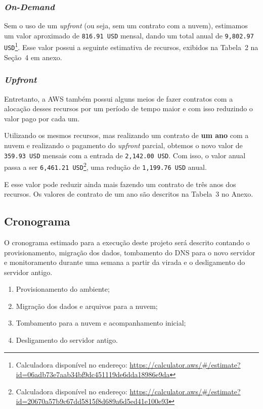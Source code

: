 \documentclass{article}
\begin{document}
\subsubsection{\textit{On-Demand}}

Sem o uso de um \textit{upfront} (ou seja, sem um contrato com a nuvem), estimamos um valor aproximado de \texttt{816.91 USD} mensal, dando um total anual de \texttt{9,802.97 USD}\footnote{Calculadora disponível no endereço: \url{https://calculator.aws/\#/estimate?id=06adb73e7aab34bf9dc451119de6dda18986e9da}}. Esse valor possui a seguinte estimativa de recursos, exibidos na Tabela~2 na Seção~4 em anexo.


\subsubsection{\textit{Upfront}}

Entretanto, a AWS também possui alguns meios de fazer contratos com a alocação desses recursos por um período de tempo maior e com isso reduzindo o valor pago por cada um.

Utilizando os mesmos recursos, mas realizando um contrato de \textbf{um ano} com a nuvem e realizando o pagamento do \textit{upfront} parcial, obtemos o novo valor de \texttt{359.93 USD} mensais com a entrada de \texttt{2,142.00 USD}. 
Com isso, o valor anual passa a ser \texttt{6,461.21 USD}\footnote{Calculadora disponível no endereço: \url{https://calculator.aws/\#/estimate?id=20670a57b9c67dd5815f8d689a6d5ed41e100e93}}, uma redução de \texttt{1,199.76 USD} anual. 

E esse valor pode reduzir ainda mais fazendo um contrato de três anos dos recursos. Os valores de contrato de um ano são descritos na Tabela~3 no Anexo.

\subsection{Cronograma}

O cronograma estimado para a execução deste projeto será descrito contando o provisionamento, migração dos dados, tombamento do DNS para o novo servidor e monitoramento durante uma semana a partir da virada e o desligamento do servidor antigo.

\begin{enumerate}[label=\Alph*.]
    \item Provisionamento do ambiente;
    \item Migração dos dados e arquivos para a nuvem;
    \item Tombamento para a nuvem e acompanhamento inicial;
    \item Desligamento do servidor antigo.
\end{enumerate}
\end{document}

